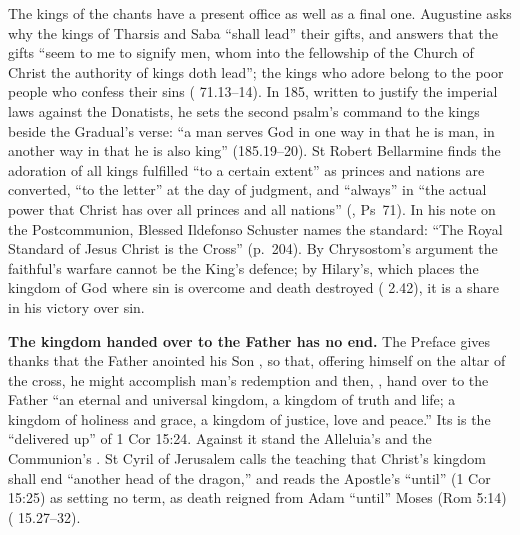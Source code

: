 The kings of the chants have a present office as well as a final one.
Augustine asks why the kings of Tharsis and Saba ``shall lead'' their gifts, and
answers that the gifts ``seem to me to signify
men, whom into the fellowship of the Church of Christ the authority of kings
doth lead''; the kings who adore belong to the poor people who confess their
sins ( 71.13--14). In  185, written
to justify the imperial laws against the Donatists, he sets the second
psalm's command to the kings beside the Gradual's verse: ``a man serves God in
one way in that he is man, in another way in that he is also king''
(185.19--20). St Robert Bellarmine finds the adoration of all kings fulfilled
``to a certain extent'' as princes and nations are converted, ``to the letter''
at the day of judgment, and ``always'' in ``the actual power that Christ has
over all princes and all nations'' (, Ps~71). In
his note on the Postcommunion, Blessed Ildefonso Schuster names the standard:
``The Royal Standard of Jesus Christ is the Cross'' (p.~204). By Chrysostom's
argument the faithful's warfare cannot be the King's defence; by Hilary's,
which places the kingdom of God where sin is overcome and death destroyed
( 2.42), it is a share in his victory over
sin.

\textbf{The kingdom handed over to the Father has no end.} The Preface gives
thanks that the Father anointed his Son , so that, offering himself on the altar of the cross, he
might accomplish man's redemption and then, , hand over to the Father ``an eternal and universal
kingdom, a kingdom of truth and life; a kingdom of holiness and grace, a
kingdom of justice, love and peace.'' Its  is the ``delivered
up'' of 1 Cor 15:24. Against it stand the Alleluia's  and the Communion's . St Cyril of Jerusalem calls the teaching that Christ's kingdom shall
end ``another head of the dragon,'' and reads the Apostle's ``until'' (1 Cor
15:25) as setting no term, as death reigned from Adam ``until'' Moses (Rom 5:14)
( 15.27--32).


